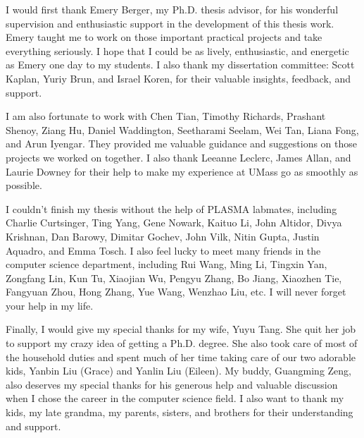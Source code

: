 I would first thank Emery Berger, my Ph.D. thesis advisor, for his wonderful supervision and enthusiastic support in the development of this thesis work. Emery taught me to work on those important practical projects and take everything seriously. I hope that I could be as lively, enthusiastic, and energetic as Emery one day to my students. I also thank my dissertation committee: Scott Kaplan, Yuriy Brun, and Israel Koren, for their valuable insights, feedback, and support. 

I am also fortunate to work with Chen Tian, Timothy Richards, Prashant Shenoy, Ziang Hu, Daniel Waddington, Seetharami Seelam, Wei Tan, Liana Fong, and Arun Iyengar. They provided me valuable guidance and suggestions on those projects we worked on together. I also thank Leeanne Leclerc, James Allan, and Laurie Downey for their help to make my experience at UMass go as smoothly as possible. 

I couldn't finish my thesis without the help of PLASMA  labmates, including Charlie Curtsinger, Ting Yang, Gene Nowark, Kaituo Li, John Altidor, Divya Krishnan, Dan Barowy, Dimitar Gochev, John Vilk, Nitin Gupta, Justin Aquadro, and Emma Tosch. I also feel lucky to meet many friends in the computer science department, including Rui Wang, Ming Li, Tingxin Yan, Zongfang Lin, Kun Tu, Xiaojian Wu, Pengyu Zhang, Bo Jiang, Xiaozhen Tie, Fangyuan Zhou, Hong Zhang, Yue Wang, Wenzhao Liu, etc. I will never forget your help in my life. 

Finally, I would give my special thanks for my wife, Yuyu Tang. She quit her job to support my crazy idea of getting a Ph.D. degree. She also took care of most of the household duties and spent much of her time taking care of our two adorable kids, Yanbin Liu (Grace) and Yanlin Liu (Eileen). My buddy, Guangming Zeng, also deserves my special thanks for his generous help and valuable discussion when I chose the career in the computer science field. I also want to thank my kids, my late grandma, my parents, sisters, and brothers for their understanding and support.    

